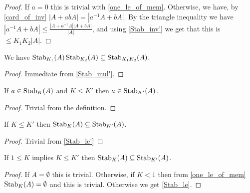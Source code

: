 \begin{proof}
    \leanok
    If $a = 0$ this is trivial with \ref{one_le_of_mem}. Otherwise, we have, by \ref{card_of_inv}
    $|A + a b A| = |a^{-1} A + b A|$. By the triangle inequality we have
    $|a^{-1} A + b A| \leq \frac{|A + a^{-1} A| |A + b A|}{|A|}$, and using \ref{Stab_inv'} we get that this is
    $\leq K_1 K_2 |A|$.
\end{proof}

\begin{lemma}
    \label{Stab_mul}
    \leanok
    We have $\operatorname{\operatorname{Stab}}_{K_1}(A) \operatorname{\operatorname{Stab}}_{K_2}(A) \subseteq \operatorname{\operatorname{Stab}}_{K_1 K_2}(A)$.
\end{lemma}

\begin{proof}
    \leanok
    Immediate from \ref{Stab_mul'}.
\end{proof}

\begin{lemma}
    \label{Stab_le'}
    \leanok
    If $a \in \operatorname{\operatorname{Stab}}_K(A)$ and $K \leq K'$ then $a \in \operatorname{\operatorname{Stab}}_{K'}(A)$.
\end{lemma}

\begin{proof}
    \leanok
    Trivial from the definition.
\end{proof}

\begin{lemma}
    \label{Stab_le}
    \leanok
    If $K \leq K'$ then $\operatorname{\operatorname{Stab}}_K(A) \subseteq \operatorname{\operatorname{Stab}}_{K'}(A)$.
\end{lemma}

\begin{proof}
    \leanok
    Trivial from \ref{Stab_le'}
\end{proof}

\begin{lemma}
    \label{Stab_le_2}
    \leanok
    If $1 \leq K$ implies $K \leq K'$ then $\operatorname{\operatorname{Stab}}_K(A) \subseteq \operatorname{\operatorname{Stab}}_{K'}(A)$.
\end{lemma}

\begin{proof}
    \leanok
    If $A = \emptyset$ this is trivial.
    Otherwise, if $K < 1$ then from \ref{one_le_of_mem} $\operatorname{\operatorname{Stab}}_K(A) = \emptyset$ and this is trivial.
    Otherwise we get \ref{Stab_le}.
\end{proof}

